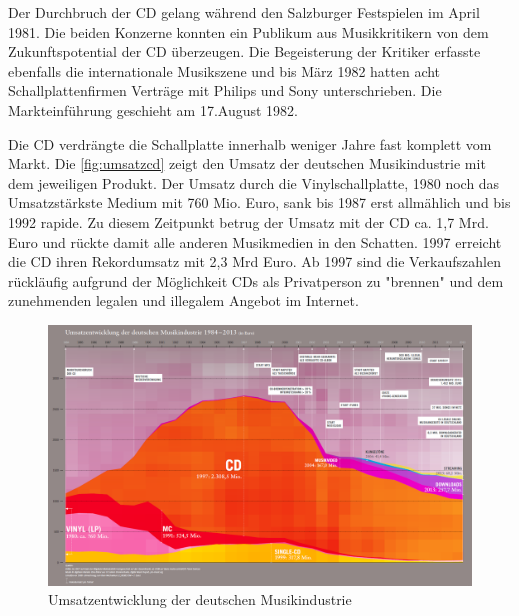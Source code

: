 Der Durchbruch der CD gelang während den Salzburger Festspielen im April 1981.
Die beiden Konzerne konnten ein Publikum aus Musikkritikern von dem
Zukunftspotential der CD überzeugen. Die Begeisterung der Kritiker erfasste
ebenfalls die internationale Musikszene und bis März 1982 hatten acht
Schallplattenfirmen Verträge mit Philips und Sony unterschrieben. Die
Markteinführung geschieht am 17.August 1982. \cite{cuz}

Die CD verdrängte die Schallplatte innerhalb weniger Jahre fast komplett vom
Markt. Die \autoref{fig:umsatzcd} zeigt den Umsatz der deutschen Musikindustrie
mit dem jeweiligen Produkt. Der Umsatz durch die Vinylschallplatte, 1980 noch
das Umsatzstärkste Medium mit 760 Mio. Euro, sank bis 1987 erst allmählich und
bis 1992 rapide. Zu diesem Zeitpunkt betrug der Umsatz mit der CD ca. 1,7 Mrd.
Euro und rückte damit alle anderen Musikmedien in den Schatten. 1997 erreicht
die CD ihren Rekordumsatz mit 2,3 Mrd Euro. Ab 1997 sind die Verkaufszahlen
rückläufig aufgrund der Möglichkeit CDs als Privatperson zu
"brennen" und dem zunehmenden legalen und
illegalem Angebot im Internet.

\begin{figure}[h]
  \begin{center}
      \begin{minipage}[t]{\textwidth}
        \begin{center}
            \includegraphics[width=\textwidth]{Bilder/Optische_Datentraeger_Die_Compact_Disc/Geschichte/umsatzcd.png}
            \caption[Umsatzentwicklung der deutschen Musikindustrie \newline \url{http://www.musikindustrie.de/uploads/media/140325\_BVMI\_2013\_Jahrbuch\_ePaper\_V02.pdf} S. 7 (zuletzt aufgerufen am 03.08.2015)]{Umsatzentwicklung der deutschen Musikindustrie}
            \label{fig:umsatzcd}
        \end{center}
      \end{minipage}
  \end{center}
\end{figure}

